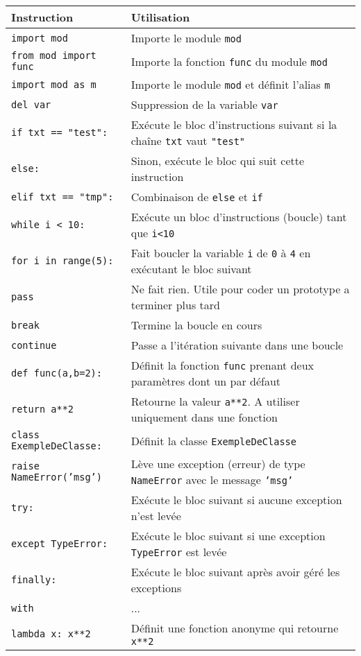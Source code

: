 \documentclass{article}
\begin{document}
\begin{tabular}{|l|l|}
    \hline
    Instruction                     & Utilisation\\
    \hline
    \texttt{import mod}             & Importe le module \texttt{mod}\\
    \texttt{from mod import func}   & Importe la fonction \texttt{func} du module \texttt{mod}\\
    \texttt{import mod as m}        & Importe le module \texttt{mod} et définit l'alias \texttt{m}\\
    \texttt{del var}                & Suppression de la variable \texttt{var}\\
    \texttt{if txt == "test":}      & Exécute le bloc d'instructions suivant si la chaîne \texttt{txt} vaut \texttt{"test"}\\
    \texttt{else:}                  & Sinon, exécute le bloc qui suit cette instruction\\
    \texttt{elif txt == "tmp":}     & Combinaison de \texttt{else} et \texttt{if}\\
    \texttt{while i < 10:}          & Exécute un bloc d'instructions (boucle) tant que \texttt{i<10}\\
    \texttt{for i in range(5):}     & Fait boucler la variable \texttt{i} de \texttt{0} à \texttt{4} en exécutant le bloc suivant\\
    \texttt{pass}                   & Ne fait rien. Utile pour coder un prototype a terminer plus tard\\
    \texttt{break}                  & Termine la boucle en cours\\
    \texttt{continue}               & Passe a l'itération suivante dans une boucle\\
    \texttt{def func(a,b=2):}       & Définit la fonction \texttt{func} prenant deux paramètres dont un par défaut\\
    \texttt{return a**2}            & Retourne la valeur \texttt{a**2}. A utiliser uniquement dans une fonction\\
    \texttt{class ExempleDeClasse:} & Définit la classe \texttt{ExempleDeClasse}\\
    \texttt{raise NameError('msg')} & Lève une exception (erreur) de type \texttt{NameError} avec le message \texttt{'msg'}\\
    \texttt{try:}                   & Exécute le bloc suivant si aucune exception n'est levée\\
    \texttt{except TypeError:}      & Exécute le bloc suivant si une exception \texttt{TypeError} est levée\\
    \texttt{finally:}               & Exécute le bloc suivant après avoir géré les exceptions\\
    \texttt{with}                   & ...\\
    \texttt{lambda x: x**2}         & Définit une fonction anonyme qui retourne \texttt{x**2}\\
    \hline
\end{tabular}
\end{document}
